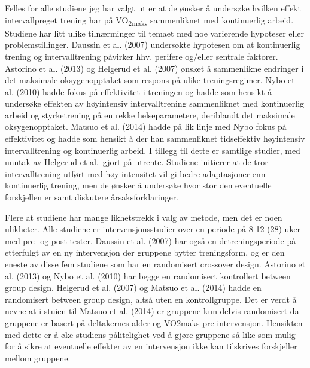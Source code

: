 \documentclass[
  letterpaper,
  DIV=11,
  numbers=noendperiod]{scrartcl}
\begin{document}
Felles for alle studiene jeg har valgt ut er at de ønsker å undersøke
hvilken effekt intervallpreget trening har på VO\textsubscript{2maks}
sammenliknet med kontinuerlig arbeid. Studiene har litt ulike
tilnærminger til temaet med noe varierende hypoteser eller
problemstillinger. Daussin et al. (2007) undersøkte hypotesen om at
kontinuerlig trening og intervalltrening påvirker hhv. perifere og/eller
sentrale faktorer. Astorino et al. (2013) og Helgerud et al. (2007)
ønsket å sammenlikne endringer i det maksimale oksygenopptaket som
respons på ulike treningsregimer. Nybo et al. (2010) hadde fokus på
effektivitet i treningen og hadde som hensikt å undersøke effekten av
høyintensiv intervalltrening sammenliknet med kontinuerlig arbeid og
styrketrening på en rekke helseparametere, deriblandt det maksimale
oksygenopptaket. Matsuo et al. (2014) hadde på lik linje med Nybo fokus
på effektivitet og hadde som hensikt å der han sammenliknet tidseffektiv
høyintensiv intervalltrening og kontinuerlig arbeid. I tillegg til dette
er samtlige studier, med unntak av Helgerud et al.~gjort på utrente.
Studiene initierer at de tror intervalltrening utført med høy intensitet
vil gi bedre adaptasjoner enn kontinuerlig trening, men de ønsker å
undersøke hvor stor den eventuelle forskjellen er samt diskutere
årsaksforklaringer.

Flere at studiene har mange likhetstrekk i valg av metode, men det er
noen ulikheter. Alle studiene er intervensjonsstudier over en periode på
8-12 (28) uker med pre- og post-tester. Daussin et al. (2007) har også
en detreningsperiode på etterfulgt av en ny intervensjon der gruppene
bytter treningsform, og er den eneste av disse fem studiene som har en
randomisert crossover design. Astorino et al. (2013) og Nybo et al.
(2010) har begge en randomisert kontrollert between group design.
Helgerud et al. (2007) og Matsuo et al. (2014) hadde en randomisert
between group design, altså uten en kontrollgruppe. Det er verdt å nevne
at i stuien til Matsuo et al. (2014) er gruppene kun delvis randomisert
da gruppene er basert på deltakernes alder og VO2maks pre-intervensjon.
Hensikten med dette er å øke studiens pålitelighet ved å gjøre gruppene
så like som mulig for å sikre at eventuelle effekter av en intervensjon
ikke kan tilskrives forskjeller mellom gruppene.
\end{document}
